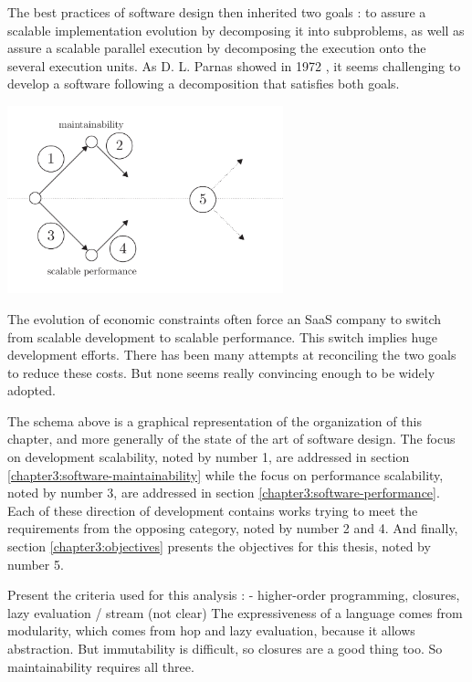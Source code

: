 The best practices of software design then inherited two goals : to assure a scalable implementation evolution by decomposing it into subproblems, as well as assure a scalable parallel execution by decomposing the execution onto the several execution units.
As D. L. Parnas showed in 1972 \cite{Parnas1972}, it seems challenging to develop a software following a decomposition that satisfies both goals.

\begin{center}
\includegraphics[width=0.6\textwidth]{../ressources/state-of-the-art.pdf}
\end{center}

The evolution of economic constraints often force an SaaS company to switch from scalable development to scalable performance.
This switch implies huge development efforts.
There has been many attempts at reconciling the two goals to reduce these costs.
But none seems really convincing enough to be widely adopted.

The schema above is a graphical representation of the organization of this chapter, and more generally of the state of the art of software design.
The focus on development scalability, noted by number 1, are addressed in section \ref{chapter3:software-maintainability} while the focus on performance scalability, noted by number 3, are addressed in section \ref{chapter3:software-performance}.
Each of these direction of development contains works trying to meet the requirements from the opposing category, noted by number 2 and 4.
And finally, section \ref{chapter3:objectives} presents the objectives for this thesis, noted by number 5.




Present the criteria used for this analysis : 
- higher-order programming, closures, lazy evaluation / stream (not clear)
The expressiveness of a language comes from modularity, which comes from hop and lazy evaluation, because it allows abstraction.
But immutability is difficult, so closures are a good thing too.
So maintainability requires all three.


